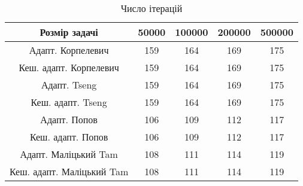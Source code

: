 \begin{table}[H]
	\centering
	\begin{tabular}{|c||c|c|c|c|}\hline
		Розмір задачі & 50000 & 100000 & 200000 & 500000 \\ \hline \hline
		Адапт. Корпелевич & 159 & 164 & 169 & 175 \\ \hline
		Кеш. адапт. Корпелевич & 159 & 164 & 169 & 175 \\ \hline
		Адапт. Tseng & 159 & 164 & 169 & 175 \\ \hline
		Кеш. адапт. Tseng & 159 & 164 & 169 & 175 \\ \hline
		Адапт. Попов & 106 & 109 & 112 & 117 \\ \hline
		Кеш. адапт. Попов & 106 & 109 & 112 & 117 \\ \hline
		Адапт. Маліцький Tam & 108 & 111 & 114 & 119 \\ \hline
		Кеш. адапт. Маліцький Tam & 108 & 111 & 114 & 119 \\ \hline
	\end{tabular}
	\caption{Число ітерацій}
\end{table}

